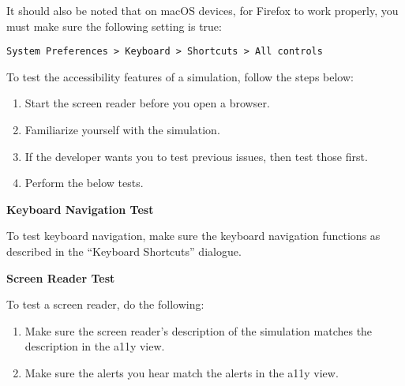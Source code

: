 \documentclass[titlepage]{article}
\begin{document}
It should also be noted that on macOS devices, for Firefox to work properly, you must make sure the following setting is true:

\verb|System Preferences > Keyboard > Shortcuts > All controls|

To test the accessibility features of a simulation, follow the steps below:

		\begin{enumerate}
			\item Start the screen reader before you open a browser.
			\item Familiarize yourself with the simulation.
			\item If the developer wants you to test previous issues, then test those first.
			\item Perform the below tests.
		\end{enumerate}

\textbf{Keyboard Navigation Test}

To test keyboard navigation, make sure the keyboard navigation functions as described in the ``Keyboard Shortcuts'' dialogue.

\textbf{Screen Reader Test}

To test a screen reader, do the following:
		\begin{enumerate}
			\item Make sure the screen reader's description of the simulation matches the description in the a11y view. 
			\item Make sure the alerts you hear match the alerts in the a11y view.
		\end{enumerate}

\pagebreak
\end{document}
